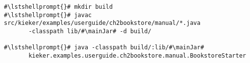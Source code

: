 \begin{lstlisting}[caption=Commands to compile and run the instrumented Bookstore under \UnixLikeSystems{},label=lst:bookstoreStarterLinux]
#\lstshellprompt{}# mkdir build
#\lstshellprompt{}# javac src/kieker/examples/userguide/ch2bookstore/manual/*.java 
       -classpath lib/#\mainJar# -d build/

#\lstshellprompt{}# java -classpath build/:lib/#\mainJar#
       kieker.examples.userguide.ch2bookstore.manual.BookstoreStarter
\end{lstlisting} 